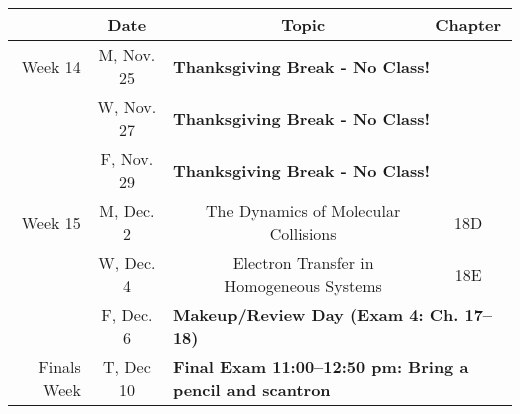 \documentclass[12pt, letterpaper]{article}
\begin{document}
\noindent
\begin{tabular}{rcccc}
& Date && Topic & Chapter\\
\midrule
Week 14 & M, Nov. 25& \multicolumn{3}{l}{\textbf{Thanksgiving Break - No Class!}}\\
& W, Nov. 27& \multicolumn{3}{l}{\textbf{Thanksgiving Break - No Class!}}\\
& F, Nov. 29& \multicolumn{3}{l}{\textbf{Thanksgiving Break - No Class!}}\\
\midrule
Week 15 & M, Dec. 2&& The Dynamics of Molecular Collisions & 18D\\
& W, Dec. 4&& Electron Transfer in Homogeneous Systems & 18E\\
& F, Dec. 6& \multicolumn{3}{l}{\textbf{Makeup/Review Day (Exam 4: Ch. 17--18)}}\\
\midrule
\midrule
Finals Week& T, Dec 10& \multicolumn{3}{l}{\textbf{Final Exam 11:00--12:50 pm: Bring a pencil and scantron}}\\
\end{tabular}
\end{document}
